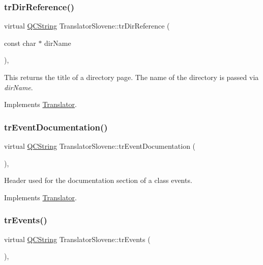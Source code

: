 \subsubsection{\texorpdfstring{trDirReference()}{trDirReference()}}
{\footnotesize\ttfamily virtual \mbox{\hyperlink{class_q_c_string}{Q\+C\+String}} Translator\+Slovene\+::tr\+Dir\+Reference (\begin{DoxyParamCaption}\item[{const char $\ast$}]{dir\+Name }\end{DoxyParamCaption})\hspace{0.3cm}{\ttfamily [inline]}, {\ttfamily [virtual]}}

This returns the title of a directory page. The name of the directory is passed via {\itshape dir\+Name}. 

Implements \mbox{\hyperlink{class_translator}{Translator}}.

\mbox{\label{class_translator_slovene_ae2e0905cf87e6c623e6495a1e16018bb}} 
\subsubsection{\texorpdfstring{trEventDocumentation()}{trEventDocumentation()}}
{\footnotesize\ttfamily virtual \mbox{\hyperlink{class_q_c_string}{Q\+C\+String}} Translator\+Slovene\+::tr\+Event\+Documentation (\begin{DoxyParamCaption}{ }\end{DoxyParamCaption})\hspace{0.3cm}{\ttfamily [inline]}, {\ttfamily [virtual]}}

Header used for the documentation section of a class\textquotesingle{} events. 

Implements \mbox{\hyperlink{class_translator}{Translator}}.

\mbox{\label{class_translator_slovene_af55b066161283b049e039b03631b36d0}} 
\subsubsection{\texorpdfstring{trEvents()}{trEvents()}}
{\footnotesize\ttfamily virtual \mbox{\hyperlink{class_q_c_string}{Q\+C\+String}} Translator\+Slovene\+::tr\+Events (\begin{DoxyParamCaption}{ }\end{DoxyParamCaption})\hspace{0.3cm}{\ttfamily [inline]}, {\ttfamily [virtual]}}

